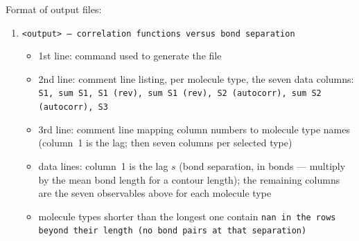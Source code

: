 \noindent
Format of output files:
\begin{enumerate}[nosep,leftmargin=20pt]
  \item \tt{<output>} --- correlation functions versus bond separation
    \begin{itemize}[nosep,leftmargin=5pt]
      \item 1st line: command used to generate the file
      \item 2nd line: comment line listing, per molecule type, the seven data
        columns: \tt{S1}, \tt{sum S1}, \tt{S1 (rev)}, \tt{sum S1 (rev)},
        \tt{S2 (autocorr)}, \tt{sum S2 (autocorr)}, \tt{S3}
      \item 3rd line: comment line mapping column numbers to molecule type names
        (column~1 is the lag; then seven columns per selected type)
      \item data lines: column~1 is the lag $s$ (bond separation, in bonds ---
        multiply by the mean bond length for a contour length); the remaining
        columns are the seven observables above for each molecule type
      \item molecule types shorter than the longest one contain \tt{nan} in the
        rows beyond their length (no bond pairs at that separation)
    \end{itemize}
\end{enumerate}

